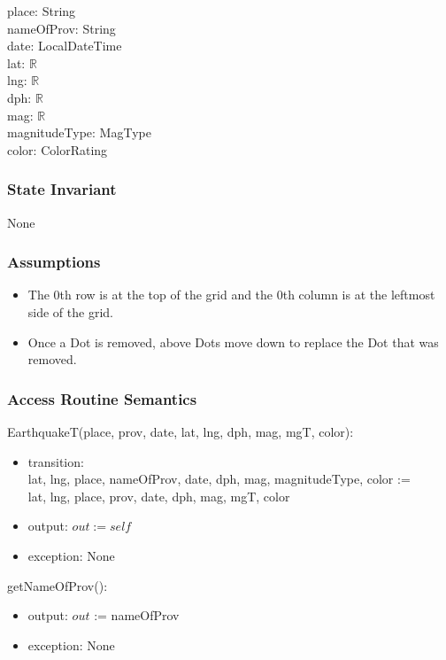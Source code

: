 \documentclass[12pt]{article}
\begin{document}
place: String\\ 
nameOfProv: String\\
date: LocalDateTime\\
lat: $\mathbb{R}$\\
lng: $\mathbb{R}$\\
dph: $\mathbb{R}$\\
mag: $\mathbb{R}$\\
magnitudeType: MagType\\
color: ColorRating

\subsubsection* {State Invariant}

None

\subsubsection* {Assumptions}

\begin{itemize}
\item The 0th row is at the top of the grid and the 0th column
  is at the leftmost side of the grid.
\item Once a Dot is removed, above Dots move down to replace the Dot that was removed.
\end{itemize}

\medskip

\subsubsection* {Access Routine Semantics}

EarthquakeT(place, prov, date, lat, lng, dph, mag, mgT, color):
\begin{itemize}
\item transition: \\ lat, lng, place, nameOfProv, date, dph, mag, magnitudeType, color :=\\
  lat, lng, place, prov, date, dph, mag, mgT, color
\item output: $\mathit{out} := \mathit{self}$
\item exception: None
\end{itemize}

\noindent getNameOfProv():
\begin{itemize}
\item output: $out$ := nameOfProv
\item exception: None
\end{itemize}
\end{document}
